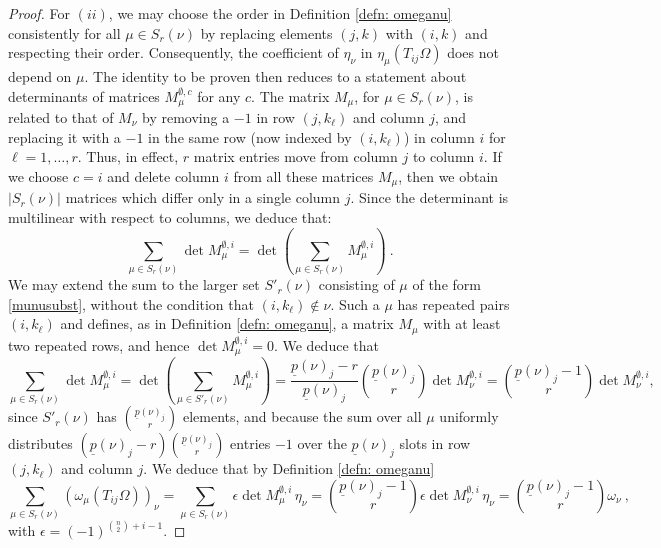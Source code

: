 \documentclass[10pt]{amsart}
\newcommand{\pp}{{\underline{p}}}
\theoremstyle{plain}
\newcommand{\0}{\color{blue}{\mathsf{0}}}
\begin{document}
\begin{proof}
For $(ii)$,  we may choose the order in Definition \ref{defn: omeganu}  consistently for all $\mu \in S_r(\nu)$ 
by replacing elements $(j,k)$ with $(i,k)$ and respecting their order.
Consequently, the coefficient of $\eta_{\nu}$ in $\eta_{\mu}(T_{ij}\Omega)$ does not depend on $\mu$. The identity to be proven then reduces to a statement about determinants of matrices $M^{\emptyset,c}_{\mu}$ for any $c$.  
The matrix $M_{\mu}$, for $\mu \in S_{r}(\nu)$, is related to that of $M_\nu$ by removing  a $-1$ in row $(j,k_\ell)$ and column $j$, 
and replacing it with a  $-1$ in the same row (now indexed by $(i,k_{\ell})$) in column $i$ for $\ell =1, \ldots, r$.  Thus, in effect, $r$ matrix entries move from column $j$ to column $i$. 
If we choose $c=i$ and  delete column $i$ from all these matrices $M_{\mu}$, 
then we obtain  $|S_r(\nu)|$   matrices which differ only in a single column $j$. Since the determinant is multilinear with respect to columns, we deduce that:
\[
\sum_{\mu \in S_{r}(\nu)}\det M_{\mu}^{\emptyset,i}=\det \left(\sum_{\mu \in S_{r}(\nu)} M_{\mu}^{\emptyset,i}\right) \ .
\]
We may extend the sum to the larger set $S'_r(\nu)$ consisting of $\mu$ of the form \eqref{munusubst}, without the condition that $(i,k_\ell) \notin \nu$. Such a $\mu$ has repeated pairs $(i,k_\ell)$ and defines, as in Definition \ref{defn: omeganu},  a matrix $M_{\mu}$ with at least two repeated rows, and hence $\det M^{\emptyset,i}_{\mu}=0$.  We deduce that
\[ 
\sum_{\mu\in S_r(\nu)}\det M_{\mu}^{\emptyset,i}=\det \left(\sum_{\mu \in S'_r(\nu)} M_{\mu}^{\emptyset,i}\right)=\frac{\pp(\nu)_j-r}{\pp(\nu)_j}
\binom{\pp(\nu)_j}{r}  \det M^{\emptyset,i}_\nu=\binom{\pp(\nu)_j-1}{r}  \det M^{\emptyset,i}_\nu,
\] 
 since  $S'_r(\nu)$  has $\binom{\pp(\nu)_j}{r}$ elements, and because the sum over all $\mu$ uniformly distributes $(\pp(\nu)_j-r)\genfrac(){0pt}{}{\pp(\nu)_j}r$ entries $-1$ over the $\pp(\nu)_j$ slots in  row $(j,k_{\ell})$ and column $j$. We deduce that by Definition \ref{defn: omeganu}
 \[  \sum_{\mu \in S_r(\nu)}  (\omega_{\mu} (T_{ij} \Omega))_{\nu} =   \sum_{\mu \in S_r(\nu)} \epsilon \det M^{\emptyset, i}_{\mu}\,    \eta_{\nu} =     \binom{\pp(\nu)_j-1}{r}  \epsilon \det M^{\emptyset, i}_{\nu}\,    \eta_{\nu} =  \binom{\pp(\nu)_j-1}{r}  \omega_{\nu}\  , \]
with $\epsilon=(-1)^{\binom{n}2+i-1}$.
\end{proof}
\end{document}
